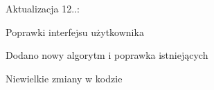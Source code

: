 Aktualizacja 12..\+:


\begin{DoxyItemize}
\item Poprawki interfejsu użytkownika
\item Dodano nowy algorytm i poprawka istniejących
\item Niewielkie zmiany w kodzie 
\end{DoxyItemize}